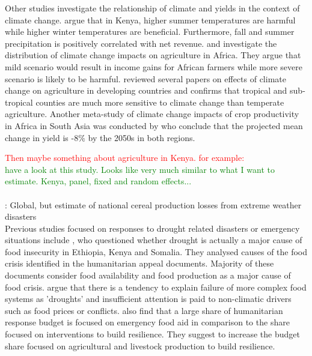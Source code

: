 \documentclass[a4paper,12pt]{article}
\begin{document}
Other studies investigate the relationship of climate and yields in the context of climate change. \cite{kabubo2007} argue that in Kenya, higher summer temperatures are harmful while higher winter temperatures are beneficial. Furthermore, fall and summer precipitation is positively correlated with net revenue. \cite{KMendelsohn2008} and \cite{SeoMendelsohn} investigate the distribution of climate change impacts on agriculture in Africa. They argue that mild scenario would result in income gains for African farmers while more severe scenario is likely to be harmful.
\cite{Mendelsohn2008} reviewed several papers on effects of climate change on agriculture in developing countries and confirms that tropical and sub-tropical counties are much more sensitive to climate change than temperate agriculture. Another meta-study of climate change impacts of crop productivity in Africa in South Asia was conducted by \cite{Knox2012} who conclude that the projected mean change in yield is -$8\%$ by the 2050s in both regions. 

\textcolor{red}{Then maybe something about agriculture in Kenya. for example:}
 \\
 \cite{Kabubo2015} \textcolor{green}{have a look at this study. Looks like very much similar to what I want to estimate. Kenya, panel, fixed and random effects...}\\
 \cite{WorldBank2015} \\
  \cite{Lesk2016}: Global, but estimate of national cereal production losses from extreme weather disasters
 \\
 

Previous studies focused on responses to drought related disasters or emergency situations include \cite{Sandstorm2017}, who questioned whether drought is actually a major cause of food insecurity in Ethiopia, Kenya and Somalia. They analysed causes of the food crisis identified in the humanitarian appeal documents. Majority of these documents consider food availability and food production as a major cause of food crisis. \cite{Sandstorm2017} argue that there is a tendency to explain failure of more complex food systems as 'droughts' and insufficient attention is paid to non-climatic drivers such as food prices or conflicts.  \cite{Sandstorm2017} also find that a large share of humanitarian response budget is focused on emergency food aid in comparison to the share focused on interventions to build resilience. They suggest to increase the budget share focused on agricultural and livestock production to build resilience. 
\end{document}
